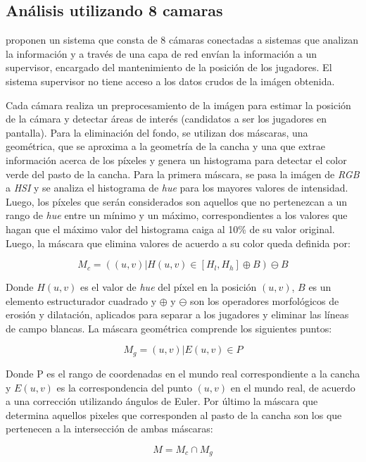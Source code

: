 \documentclass[a4paper,10pt]{article}
\begin{document}

\subsection{Análisis utilizando 8 camaras}
\label{sec:8-camaras}

\citeauthor*{xu-8cams} proponen un sistema que consta de 8 cámaras conectadas a
sistemas que analizan la información y a través de una capa de red envían la
información a un supervisor, encargado del mantenimiento de la posición de los
jugadores. El sistema supervisor no tiene acceso a los datos crudos de la
imágen obtenida.

Cada cámara realiza un preprocesamiento de la imágen para estimar la posición
de la cámara y detectar áreas de interés (candidatos a ser los jugadores en
pantalla). Para la eliminación del fondo, se utilizan dos máscaras, una
geométrica, que se aproxima a la geometría de la cancha y una que extrae
información acerca de los píxeles y genera un histograma para detectar el color
verde del pasto de la cancha. Para la primera máscara, se pasa la imágen de
\textit{RGB} a \textit{HSI} y se analiza el histograma de \textit{hue} para los
mayores valores de intensidad. Luego, los píxeles que serán considerados son
aquellos que no pertenezcan a un rango de \textit{hue} entre un mínimo y un
máximo, correspondientes a los valores que hagan que el máximo valor del
histograma caiga al 10\% de su valor original.  Luego, la máscara que elimina
valores de acuerdo a su color queda definida por:

\[
  M_c = ({(u, v) | H(u, v) \in [H_l, H_h]} \oplus B ) \ominus B
\]

Donde $H(u, v)$ es el valor de \textit{hue} del píxel en la posición $(u, v)$,
$B$ es un elemento estructurador cuadrado y $\oplus$ y $\ominus$ son los
operadores morfológicos de erosión y dilatación, aplicados para separar a los
jugadores y eliminar las líneas de campo blancas. La máscara geométrica
comprende los siguientes puntos:

\[
  M_g = { (u, v) | E(u, v)  \in P }
\]

Donde P es el rango de coordenadas en el mundo real correspondiente a la cancha
y $E(u, v)$ es la correspondencia del punto $(u, v)$ en el mundo real, de
acuerdo a una corrección utilizando ángulos de Euler. Por último la máscara que
determina aquellos pixeles que corresponden al pasto de la cancha son los que
pertenecen a la intersección de ambas máscaras:

\[
  M = M_c \cap M_g
\]
\end{document}
